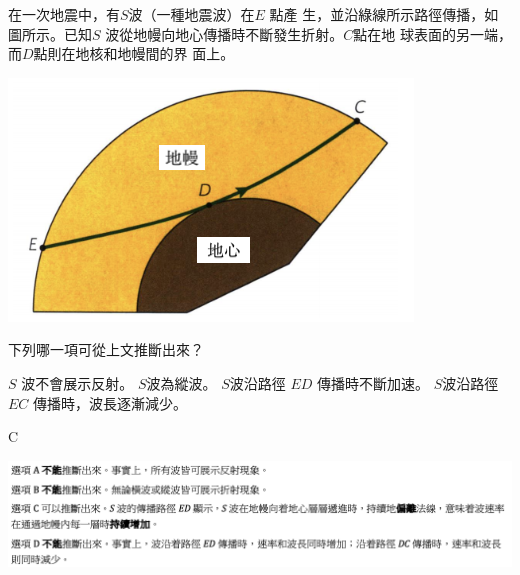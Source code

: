 {
    在一次地震中，有$S$波（一種地震波）在$E$ 點產 生，並沿綠線所示路徑傳播，如圖所示。已知$S$ 波從地幔向地心傳播時不斷發生折射。$C$點在地 球表面的另一端，而$D$點則在地核和地幔間的界 面上。
    \par{\par\centering\includegraphics[width=.4\textwidth]{./img/ch2_earlyclass_wave_mc_2024-05-13-21-36-24.png}\par}
    下列哪一項可從上文推斷出來？
    \begin{tasks}
        \task $S$ 波不會展示反射。
        \task $S$波為縱波。
        \task $S$波沿路徑 $ED$ 傳播時不斷加速。
        \task $S$波沿路徑 $EC$ 傳播時，波長逐漸減少。
    \end{tasks}
}{\mckey C
    \par{\par\centering\includegraphics[width=\textwidth]{./img/ch2_earlyclass_wave_mc_2024-05-13-21-37-32.png}\par}}